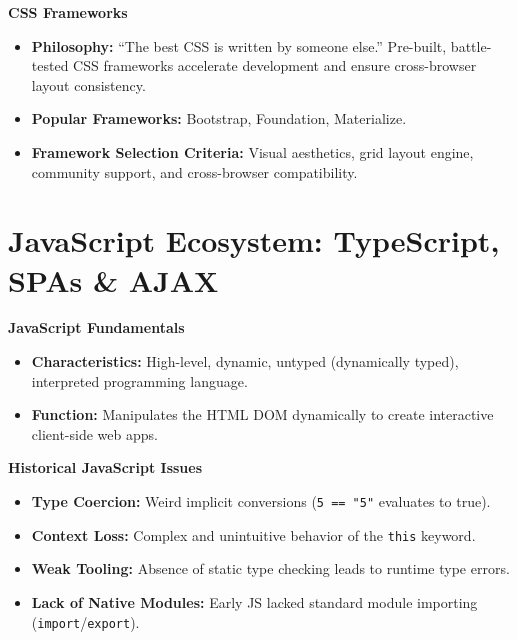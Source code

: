 \documentclass[8pt, a4paper]{article}
\begin{document}
\begin{conceptbox}
\textbf{CSS Frameworks}
\begin{itemize}
  \item \textbf{Philosophy:} ``The best CSS is written by someone else.'' Pre-built, battle-tested CSS frameworks
        accelerate development and ensure cross-browser layout consistency.
  \item \textbf{Popular Frameworks:} Bootstrap, Foundation, Materialize.
  \item \textbf{Framework Selection Criteria:} Visual aesthetics, grid layout engine, community support,
        and cross-browser compatibility.
\end{itemize}
\end{conceptbox}

\section{JavaScript Ecosystem: TypeScript, SPAs \& AJAX}

\begin{conceptbox}
\textbf{JavaScript Fundamentals}
\begin{itemize}
  \item \textbf{Characteristics:} High-level, dynamic, untyped (dynamically typed), interpreted programming language.
  \item \textbf{Function:} Manipulates the HTML DOM dynamically to create interactive client-side web apps.
\end{itemize}
\end{conceptbox}

\begin{conceptbox}
\textbf{Historical JavaScript Issues}
\begin{itemize}
  \item \textbf{Type Coercion:} Weird implicit conversions (\texttt{5 == "5"} evaluates to true).
  \item \textbf{Context Loss:} Complex and unintuitive behavior of the \texttt{this} keyword.
  \item \textbf{Weak Tooling:} Absence of static type checking leads to runtime type errors.
  \item \textbf{Lack of Native Modules:} Early JS lacked standard module importing (\texttt{import}/\texttt{export}).
\end{itemize}
\end{conceptbox}
\end{document}
